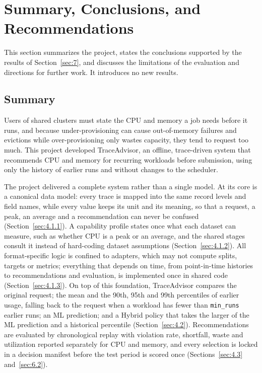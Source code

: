 \section{Summary, Conclusions, and Recommendations}\label{sec:9}

This section summarizes the project, states the conclusions supported by the results of Section~\ref{sec:7}, and discusses the limitations of the evaluation and directions for further work. It introduces no new results.

\subsection{Summary}\label{sec:9.1}

Users of shared clusters must state the CPU and memory a job needs before it runs, and because under-provisioning can cause out-of-memory failures and evictions while over-provisioning only wastes capacity, they tend to request too much. This project developed TraceAdvisor, an offline, trace-driven system that recommends CPU and memory for recurring workloads before submission, using only the history of earlier runs and without changes to the scheduler.

The project delivered a complete system rather than a single model. At its core is a canonical data model: every trace is mapped into the same record levels and field names, while every value keeps its unit and its meaning, so that a request, a peak, an average and a recommendation can never be confused (Section~\ref{sec:4.1.1}). A capability profile states once what each dataset can measure, such as whether CPU is a peak or an average, and the shared stages consult it instead of hard-coding dataset assumptions (Section~\ref{sec:4.1.2}). All format-specific logic is confined to adapters, which may not compute splits, targets or metrics; everything that depends on time, from point-in-time histories to recommendations and evaluation, is implemented once in shared code (Section~\ref{sec:4.1.3}). On top of this foundation, TraceAdvisor compares the original request; the mean and the 90th, 95th and 99th percentiles of earlier usage, falling back to the request when a workload has fewer than \texttt{min\_runs} earlier runs; an ML prediction; and a Hybrid policy that takes the larger of the ML prediction and a historical percentile (Section~\ref{sec:4.2}). Recommendations are evaluated by chronological replay with violation rate, shortfall, waste and utilization reported separately for CPU and memory, and every selection is locked in a decision manifest before the test period is scored once (Sections~\ref{sec:4.3} and~\ref{sec:6.2}).

